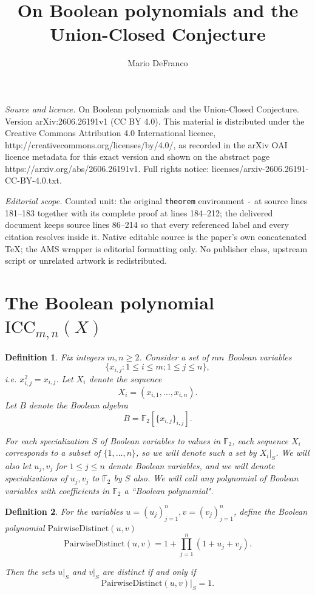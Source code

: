 \documentclass[10pt,a4paper]{amsart}
\newtheorem{definition}{Definition}
\begin{document}
\title[On Boolean polynomials and the Union-Closed Conjecture]{On Boolean polynomials and the Union-Closed Conjecture}
\author{Mario DeFranco}
\date{}
\maketitle
\noindent\emph{Source and licence.} On Boolean polynomials and the Union-Closed Conjecture. Version arXiv:2606.26191v1 (CC BY 4.0). This material is distributed under the Creative Commons Attribution 4.0 International licence, http://creativecommons.org/licenses/by/4.0/, as recorded in the arXiv OAI licence metadata for this exact version and shown on the abstract page https://arxiv.org/abs/2606.26191v1. Full rights notice: licenses/arxiv-2606.26191-CC-BY-4.0.txt.\par\smallskip
\noindent\textit{Editorial scope.} Counted unit: the original \texttt{theorem} environment \texttt{-} at source lines 181--183 together with its complete proof at lines 184--212; the delivered document keeps source lines 86--214 so that every referenced label and every citation resolves inside it. Native editable source is the paper's own concatenated TeX; the AMS wrapper is editorial formatting only. No publisher class, upstream script or unrelated artwork is redistributed.
\section{The Boolean polynomial $\mathrm{ICC}_{m,n}(X)$ }
\begin{definition} 
Fix integers $m,n \geq 2$. Consider a set of $mn$ Boolean variables $$\{x_{i,j} : 1 \leq i \leq m; 1 \leq j \leq n \},$$ i.e. $x_{i,j}^2 = x_{i,j}$. Let $X_i$ denote the sequence  
$$X_i = (x_{i,1}, \ldots, x_{i,n}).$$ 
Let $B$ denote the Boolean algebra $$B=\mathbb{F}_2[\{x_{i,j}\}_{i,j}] .$$


For each specialization $S$ of Boolean variables  to values in $\mathbb{F}_2$, each sequence $X_i$ corresponds to a subset of $\{ 1, \ldots, n\}$, so we will denote such a set by $X_i|_S$. We will also let $u_j, v_j$ for $1 \leq j  \leq n$ denote Boolean variables, and we will denote specializations of $u_j,v_j$ to $\mathbb{F}_2$ by $S$ also. We will call any polynomial of Boolean variables with coefficients in $\mathbb{F}_2$ a \emph{``Boolean polynomial"}. 
\end{definition} 

\begin{definition} For the variables $u=(u_j)_{j=1}^n, v=(v_j)_{j=1}^n$, define the Boolean polynomial $\mathrm{PairwiseDistinct}(u,v)$
$$
\mathrm{PairwiseDistinct}(u,v)=1+\prod_{j=1}^n (1+u_j+v_{j}).
$$

Then the sets $u|_S$ and $v|_S$ are distinct if and only if 
$$\mathrm{PairwiseDistinct}(u,v)|_S=1.$$

\end{definition} 
\end{document}
